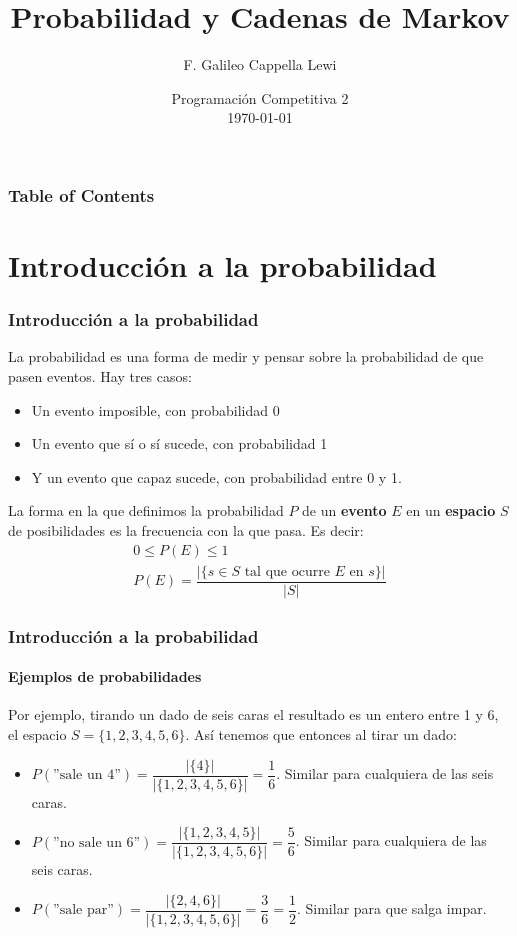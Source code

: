 \documentclass{beamer}
\title{Probabilidad y Cadenas de Markov}
\author{F. Galileo Cappella Lewi}
\date[PC2 2023]{Programación Competitiva 2\\\today}
\begin{document}
\frame{\titlepage}

\begin{frame}
  \frametitle{Table of Contents}
  \tableofcontents
\end{frame}

\newcommand{\SECTIONA}{Introducción a la probabilidad}
\section{\SECTIONA}

\begin{frame}
  \frametitle{\SECTIONA}

  La probabilidad es una forma de medir y pensar sobre la probabilidad de que pasen eventos. \pause Hay tres casos:
  \begin{itemize}
    \item<2-> Un evento imposible, con probabilidad 0
    \item<3-> Un evento que sí o sí sucede, con probabilidad 1
    \item<4-> Y un evento que capaz sucede, con probabilidad entre 0 y 1.
  \end{itemize} \pause \pause \pause %
  La forma en la que definimos la probabilidad \(P\) de un \textbf{evento} \(E\) en un \textbf{espacio} \(S\) de posibilidades es la frecuencia con la que pasa. Es decir:
  \begin{gather*}
    0 \leq P(E) \leq 1 \\
    P(E) = \dfrac{|\{s \in S \text{ tal que ocurre } E \text{ en } s\}|}{|S|}
  \end{gather*}
\end{frame}

\begin{frame}
  \frametitle{\SECTIONA}
  \framesubtitle{Ejemplos de probabilidades}

  Por ejemplo, tirando un dado de seis caras el resultado es un entero entre 1 y 6, el espacio \(S = \{1, 2, 3, 4, 5, 6\}\). \pause Así tenemos que entonces al tirar un dado:
  \begin{itemize}
    \item<2-> \(P(\text{''sale un 4''}) = \dfrac{|\{4\}|}{|\{1, 2, 3, 4, 5, 6\}|} = \dfrac{1}{6}\). Similar para cualquiera de las seis caras.
    \item<3-> \(P(\text{''no sale un 6''}) = \dfrac{|\{1, 2, 3, 4, 5\}|}{|\{1, 2, 3, 4, 5, 6\}|} = \dfrac{5}{6}\). Similar para cualquiera de las seis caras.
    \item<4-> \(P(\text{''sale par''}) = \dfrac{|\{2, 4, 6\}|}{|\{1, 2, 3, 4, 5, 6\}|} = \dfrac{3}{6} = \dfrac{1}{2}\). Similar para que salga impar.
  \end{itemize}
\end{frame}
\end{document}
